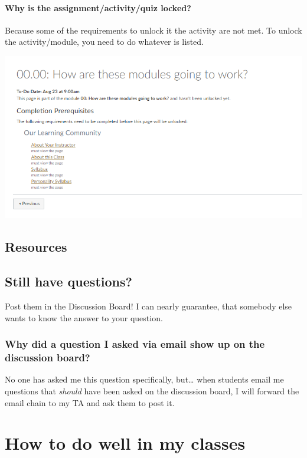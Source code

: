 \hypertarget{why-is-the-assignmentactivityquiz-locked}{%
\subsubsection{Why is the assignment/activity/quiz locked?}\label{why-is-the-assignmentactivityquiz-locked}}

Because some of the requirements to unlock it the activity are not met. To unlock the activity/module, you need to do whatever is listed.

\begin{center}\includegraphics[width=0.5\linewidth]{img/requirements} \end{center}

\hypertarget{resources-1}{%
\section{Resources}\label{resources-1}}

\hypertarget{still-have-questions}{%
\section{Still have questions?}\label{still-have-questions}}

Post them in the Discussion Board! I can nearly guarantee, that somebody else wants to know the answer to your question.

\hypertarget{why-did-a-question-i-asked-via-email-show-up-on-the-discussion-board}{%
\subsection{Why did a question I asked via email show up on the discussion board?}\label{why-did-a-question-i-asked-via-email-show-up-on-the-discussion-board}}

No one has asked me this question specifically, but\ldots{} when students email me questions that \emph{should} have been asked on the discussion board, I will forward the email chain to my TA and ask them to post it.

\hypertarget{how-to-do-well-in-my-classes}{%
\chapter{How to do well in my classes}\label{how-to-do-well-in-my-classes}}

